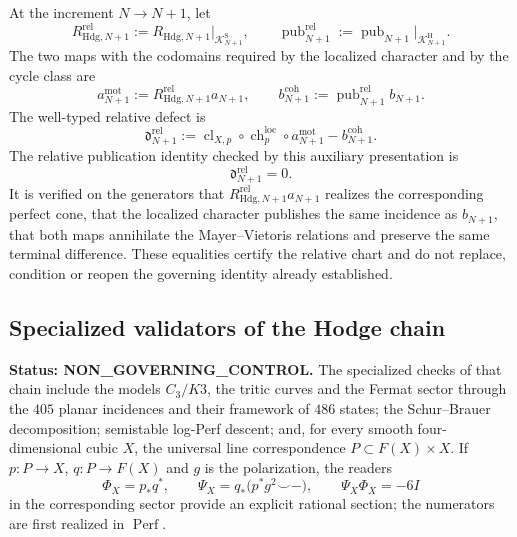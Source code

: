 At the increment \(N\to N+1\), let
\[
 R_{\mathrm{Hdg},N+1}^{\mathrm{rel}}
 :=R_{\mathrm{Hdg},N+1}\big|_{\mathscr K^{\mathrm S}_{N+1}},
 \qquad
 \operatorname{pub}_{N+1}^{\mathrm{rel}}
 :=\operatorname{pub}_{N+1}\big|_{\mathscr K^{\mathrm H}_{N+1}}.
\]
The two maps with the codomains required by the localized character and
by the cycle class are
\begin{equation}\label{eq:amp-hodge-mapas-relativos-tipados}
 a_{N+1}^{\mathrm{mot}}
 :=R_{\mathrm{Hdg},N+1}^{\mathrm{rel}}a_{N+1},
 \qquad
 b_{N+1}^{\mathrm{coh}}
 :=\operatorname{pub}_{N+1}^{\mathrm{rel}}b_{N+1}.
\end{equation}
The well-typed relative defect is
\begin{equation}\label{eq:amp-hodge-cuadrado-relativo-tipado}
 \mathfrak d_{N+1}^{\mathrm{rel}}
 :=
 \operatorname{cl}_{X,p}\circ\operatorname{ch}^{\mathrm{loc}}_p
 \circ a_{N+1}^{\mathrm{mot}}
 -b_{N+1}^{\mathrm{coh}}.
\end{equation}
The relative publication identity checked by this auxiliary presentation is
\begin{equation}\label{eq:amp-hodge-identidad-algebraica-requerida}
 \boxed{\mathfrak d_{N+1}^{\mathrm{rel}}=0.}
\end{equation}
It is verified on the generators that
\(R_{\mathrm{Hdg},N+1}^{\mathrm{rel}}a_{N+1}\) realizes the corresponding perfect
cone, that the localized character publishes the same incidence
as \(b_{N+1}\), that both maps annihilate the Mayer--Vietoris
relations and preserve the same terminal difference. These
equalities certify the relative chart and do not replace, condition or
reopen the governing identity already established.

\subsection{Specialized validators of the Hodge chain}

\noindent\textbf{Status: NON\_GOVERNING\_CONTROL.}
The specialized checks of that chain include the models
\(C_3/K3\), the tritic curves and the Fermat sector through the \(405\)
planar incidences and their framework of \(486\) states; the Schur--Brauer
decomposition; semistable log-Perf descent; and, for every smooth
four-dimensional cubic \(X\), the universal line correspondence
\(P\subset F(X)\times X\). If
\(p:P\to X\), \(q:P\to F(X)\) and \(g\) is the polarization, the readers
\begin{equation}\label{eq:hodge-suc-fano}
 \Phi_X=p_*q^*,
 \qquad
 \Psi_X=q_*\bigl(p^*g^2\smile-\bigr),
 \qquad
 \Psi_X\Phi_X=-6I
\end{equation}
in the corresponding sector provide an explicit rational section;
the numerators are first realized in \(\operatorname{Perf}\).

